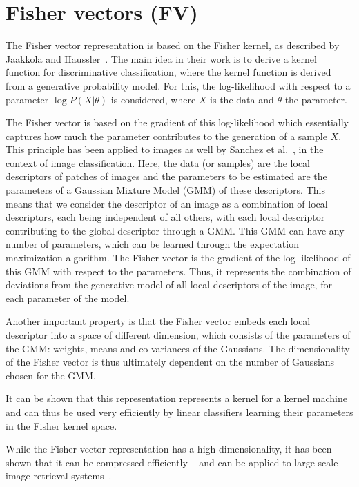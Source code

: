 \section{Fisher vectors (FV)}\label{sec:fv}
The Fisher vector representation is based on the Fisher kernel, as described
by Jaakkola and Haussler~\cite{jaakkola_exploiting_1999}. The main idea
in their work is to derive a kernel function for discriminative classification,
where the kernel function is derived from a generative probability model.
For this, the log-likelihood with respect to a parameter $\log P(X|\theta)$
is considered, where $X$ is the data and $\theta$ the parameter.

The Fisher vector is based on the gradient of this log-likelihood which
essentially captures how much the parameter contributes to the generation
of a sample $X$. This principle has been applied to images as well by
Sanchez et al.~\cite{sanchez_image_2013}, in the context of image
classification. Here, the data (or samples) are the local descriptors of
patches of images and the parameters to be estimated are the parameters
of a Gaussian Mixture Model (GMM) of these descriptors.
This means that we consider the descriptor of an image as a
combination of local descriptors, each being independent of all others,
with each local descriptor contributing to the global descriptor through
a GMM. This GMM can have any number
of parameters, which can be learned through the expectation maximization
algorithm. The Fisher vector is the gradient of the log-likelihood of this
GMM with respect to the parameters. Thus, it represents the combination
of deviations from the generative model of all local descriptors of the
image, for each parameter of the model.

Another important property is that the Fisher
vector embeds each local descriptor into a space of
different dimension, which consists of the parameters of the GMM:
weights, means and co-variances of the Gaussians.
The dimensionality of the Fisher vector is thus ultimately dependent
on the number of Gaussians chosen for the GMM.

It can be shown that this representation represents a kernel for a kernel
machine and can thus be used very efficiently by linear classifiers learning
their parameters in the Fisher kernel space.

While the Fisher vector representation has a high dimensionality, it
has been shown that it can be compressed efficiently
~\cite{sanchez_image_2013,perronnin_large-scale_2010} and can be applied
to large-scale image retrieval systems~\cite{perronnin_large-scale_2010}.

